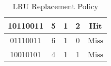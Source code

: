 \documentclass[12pt]{article}
\begin{document}
\begin{table}
\begin{tabular}{|c|c|c|c|c|}
\hline
10110011                                                                     & 5                  & 1                                                                         & 2                      & Hit                 \\ 
\hline
01110011                                                                     & 6                  & 1                                                                         & 0                      & Miss                \\ 
\hline
10010101                                                                     & 4                  & 1                                                                         & 1                      & Miss                \\
\hline
\end{tabular}
\caption{LRU Replacement Policy}
\end{table}
\end{document}
